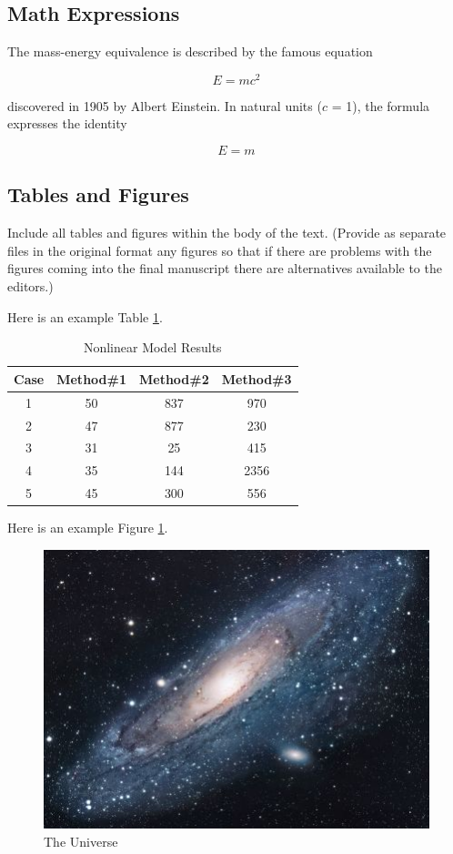 \documentclass{article}
\begin{document}
\subsection{Math Expressions}
The mass-energy equivalence is described by the famous equation

$$E=mc^2$$

discovered in 1905 by Albert Einstein.
In natural units ($c$ = 1), the formula expresses the identity

\begin{equation}
E=m
\end{equation}

\subsection{Tables and Figures}
Include all tables and figures within the body of the text. (Provide as separate
files in the original format any figures so that if there are problems with the
figures coming into the final manuscript there are alternatives available to the editors.)

Here is an example Table \ref{table:nonlin}.

\begin{table}[ht]
\caption{Nonlinear Model Results} %
\label{table:nonlin} %
\centering %
\begin{tabular}{c c c c} %
\hline\hline %
Case & Method\#1 & Method\#2 & Method\#3 \\ [0.5ex] %
\hline %
1 & 50 & 837 & 970 \\ %
2 & 47 & 877 & 230 \\
3 & 31 & 25 & 415 \\
4 & 35 & 144 & 2356 \\
5 & 45 & 300 & 556 \\ [1ex] %
\hline %
\end{tabular}
\end{table}

Here is an example Figure \ref{figure:universe}.

\begin{figure}[h!]
\centering
\includegraphics[scale=1.7]{universe}
\caption{The Universe}
\label{figure:universe}
\end{figure}
\end{document}
